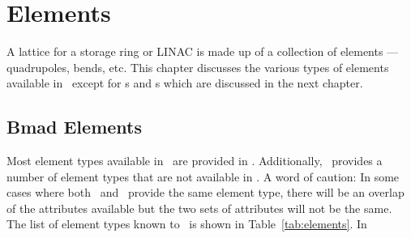 \chapter{Elements}

A lattice for a storage ring or LINAC is made up of a collection of
elements --- quadrupoles, bends, etc. This chapter discusses the
various types of elements available in \bmad\ except for s
and s which are discussed in the next chapter.

\section{Bmad Elements}

Most element types available in \mad\ are provided in \bmad.
Additionally, \bmad\ provides a number of element types that are not
available in \mad.  A word of caution: In some cases where both \mad\
and \bmad\ provide the same element type, there will be an overlap of 
the attributes available but the two sets of attributes will not be the same.
The list of element types known to \bmad\ is shown in Table~\ref{tab:elements}.
In

